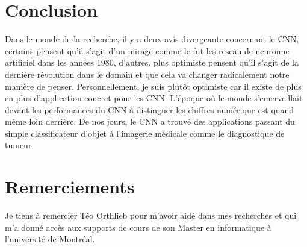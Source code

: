 \documentclass[12pt, letterpaper]{article}
\begin{document}
\section{Conclusion}
Dans le monde de la recherche, il y a deux avis divergeante concernant le CNN, certains pensent qu'il s'agit d'un mirage comme le fut les reseau de neuronne artificiel 
dans les années 1980, d'autres, plus optimiste pensent qu'il s'agit de la dernière révolution dans le domain et que cela va changer radicalement notre 
manière de penser. Personnellement, je suis plutôt optimiste car il existe de plus en plus d'application concret pour les CNN.
L'époque où le monde s'emerveillait devant les performances du CNN à distinguer les chiffres numérique est quand même loin derrière.
De nos jours, le CNN a trouvé des applications passant du simple classificateur d'objet à l'imagerie médicale comme le diagnostique de tumeur.

\section{Remerciements}
Je tiens à remercier Téo Orthlieb pour m'avoir aidé dans mes recherches et qui m'a donné accès aux supports de cours de son Master en informatique à l'université de Montréal. 

\newpage
\printbibliography
\end{document}
